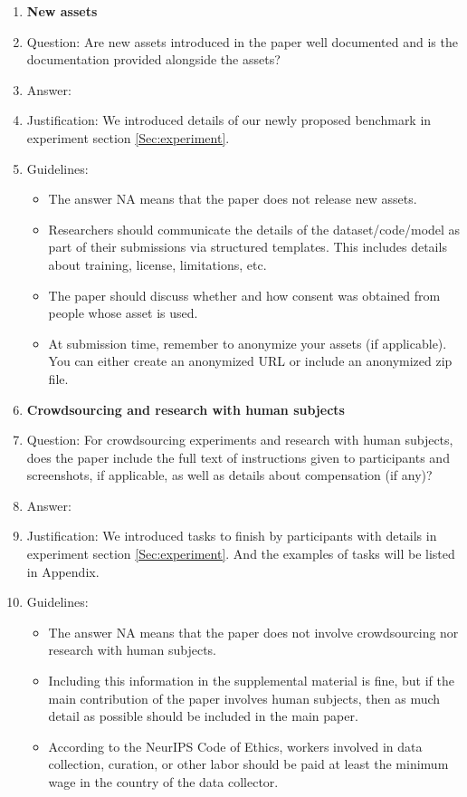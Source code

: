 \documentclass{article}
\begin{document}
\begin{enumerate}
\item {\bf New assets}
    \item[] Question: Are new assets introduced in the paper well documented and is the documentation provided alongside the assets?
    \item[] Answer: \answerYes{} %
    \item[] Justification: We introduced details of our newly proposed benchmark in experiment section \ref{Sec:experiment}.
    \item[] Guidelines:
    \begin{itemize}
        \item The answer NA means that the paper does not release new assets.
        \item Researchers should communicate the details of the dataset/code/model as part of their submissions via structured templates. This includes details about training, license, limitations, etc. 
        \item The paper should discuss whether and how consent was obtained from people whose asset is used.
        \item At submission time, remember to anonymize your assets (if applicable). You can either create an anonymized URL or include an anonymized zip file.
    \end{itemize}

\item {\bf Crowdsourcing and research with human subjects}
    \item[] Question: For crowdsourcing experiments and research with human subjects, does the paper include the full text of instructions given to participants and screenshots, if applicable, as well as details about compensation (if any)? 
    \item[] Answer: \answerYes{} %
    \item[] Justification: We introduced tasks to finish by participants with details in experiment section \ref{Sec:experiment}. And the examples of tasks will be listed in Appendix.
    \item[] Guidelines:
    \begin{itemize}
        \item The answer NA means that the paper does not involve crowdsourcing nor research with human subjects.
        \item Including this information in the supplemental material is fine, but if the main contribution of the paper involves human subjects, then as much detail as possible should be included in the main paper. 
        \item According to the NeurIPS Code of Ethics, workers involved in data collection, curation, or other labor should be paid at least the minimum wage in the country of the data collector. 
    \end{itemize}


\end{enumerate}
\end{document}
